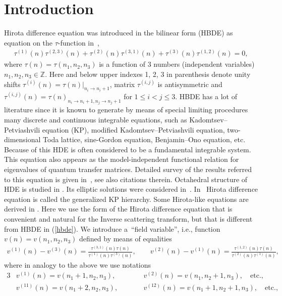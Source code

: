 \documentclass[pdftex]{sigma}
\numberwithin{equation}{section}
\begin{document}
\section{Introduction}

Hirota dif\/ference equation was introduced in the bilinear form (HBDE) as equation on the $\tau$-function
in~\cite{Hirota1977,Hirota1981},
\begin{gather}
\tau^{(1)}(n)\tau^{(2,3)}(n)+\tau^{(2)}(n)\tau^{(3,1)}(n)+\tau^{(3)}(n)\tau^{(1,2)}(n)=0,\label{hbde}
\end{gather}
where $\tau(n)=\tau(n_1,n_2,n_3)$ is a function of 3 numbers (independent variables) $n_1,n_2,n_3\in\mathbb{Z}$. Here and below upper indexes 1, 2, 3 in parenthesis denote unity shifts $\tau^{(i)}(n)=\tau(n)|_{n_i\to n_i+1}$, matrix $\tau^{(i,j)}$ is antisymmetric and $\tau^{(i,j)}(n)=\tau(n)_{n_i\to n_i+1, n_j\to n_j+1}$ for $1\leq{i}<{j}\leq3$. HBDE has a lot of literature since it is known to generate by means of special limiting procedures many discrete and continuous integrable equations, such as Kadomtsev--Petviashvili equation (KP), modif\/ied Kadomtsev--Petviashvili equation, two-dimensional Toda lattice, sine-Gordon equation, Benjamin--Ono equation, etc. Because of this HDE is often considered to be a fundamental integrable system. This equation also appears as the model-independent functional relation for eigenvalues of quantum transfer matrices. Detailed survey of the results referred to this equation is given in~\cite{Zabrodin1997,Zabrodin2008}, see also citations therein. Octahedral structure of HDE is studied in \cite{Saito}. Its elliptic solutions were considered in~\cite{Krichever/Wiegmann/Zabrodin}. In~\cite{Bogdanov/Konopelchenko} Hirota dif\/ference equation is called the generalized KP hierarchy. Some Hirota-like equations are derived in \cite{Fioravanti/Nepomechie}. Here we use the form of the Hirota dif\/ference equation that is convenient and natural for the Inverse scattering transform, but that is dif\/ferent from HBDE in (\ref{hbde}). We introduce a~``f\/ield variable'', i.e., function $v(n)=v(n_1,n_2,n_3)$ def\/ined by means of equalities
\begin{gather}
v^{(1)}(n)-v^{(3)}(n)=\frac{\tau^{(3,1)}(n)\tau(n)}{\tau^{(1)}(n)\tau^{(3)}(n)}, \qquad
v^{(2)}(n)-v^{(1)}(n)=\frac{\tau^{(1,2)}(n)\tau(n)}{\tau^{(2)}(n)\tau^{(1)}(n)},\label{vtau1}
\end{gather}
where in analogy to the above we use notations
\begin{alignat}{3}
& v^{(1)}(n)=v(n_1+1,n_2,n_3),\qquad && v^{(2)}(n)=v(n_1,n_2+1,n_3), \quad \text{etc.},& \label{5}\\
&v^{(11)}(n)=v(n_1+2,n_2,n_3),\qquad && v^{(12)}(n)=v(n_1+1,n_2+1,n_3), \quad \text{etc.}, & \label{6}
\end{alignat}
\end{document}
